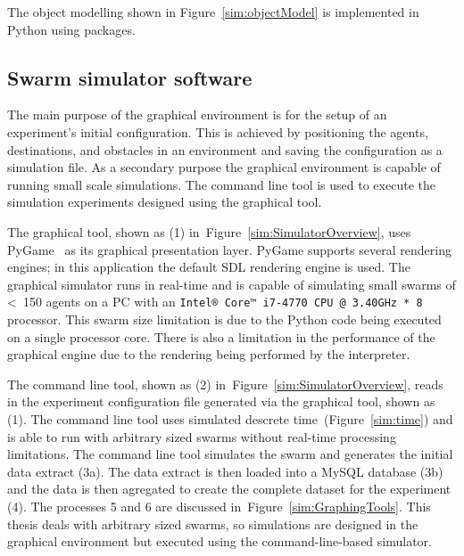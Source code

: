 The object modelling shown in Figure~\ref{sim:objectModel} is implemented in Python using packages.

\subsection{Swarm simulator software}\label{sim:Simulator2}
The main purpose of the graphical environment is for the setup of an experiment's initial configuration. This is achieved by positioning the agents, destinations, and obstacles in an environment and saving the configuration as a simulation file. As a secondary purpose the graphical environment is capable of running small scale simulations. The command line tool is used to execute the simulation experiments designed using the graphical tool. 

The graphical tool, shown as (1) in~Figure~\ref{sim:SimulatorOverview}, uses PyGame~\cite{PYGAME:15} as its graphical presentation layer. PyGame supports several rendering engines; in this application the default SDL rendering engine is used. The graphical simulator runs in real-time and is capable of simulating small swarms of \textless~150 agents on a PC with an \texttt{Intel® Core™ i7-4770 CPU @ 3.40GHz * 8} processor. This swarm size limitation is due to the Python code being executed on a single processor core. There is also a limitation in the performance of the graphical engine due to the rendering being performed by the interpreter.
 
The command line tool, shown as (2) in~Figure~\ref{sim:SimulatorOverview}, reads in the experiment configuration file generated via the graphical tool, shown as (1). The command line tool uses simulated descrete time~(Figure~\ref{sim:time}) and is able to run with arbitrary sized swarms without real-time processing limitations. The command line tool simulates the swarm and generates the initial data extract (3a). The data extract is then loaded into a MySQL database (3b) and the data is then agregated to create the complete dataset for the experiment (4). The processes 5 and 6 are discussed in~Figure~\ref{sim:GraphingTools}.  This thesis deals with arbitrary sized swarms, so simulations are designed in the graphical environment but executed using the command-line-based simulator. 

